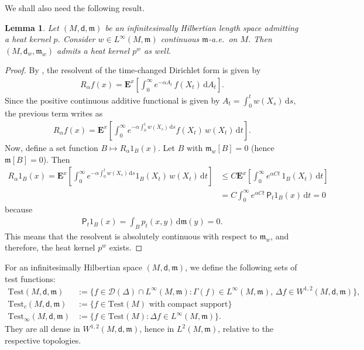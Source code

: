 \documentclass[10pt]{article}
\newcommand{\m}{\mathfrak{m}}
\newcommand{\M}{{\mathit{M}}}
\renewcommand{\d}{\,\mathrm{d}}
\newcommand{\Test}{\mathrm{Test}}
\newcommand{\D}{\mathscr{D}}
\renewcommand{\P}{\mathsf{P}}
\newcommand{\dist}{\mathsf{d}}
\theoremstyle{plain}
\newtheorem{lemma}[theorem]{Lemma}
\theoremstyle{definition}
\newcommand{\Ltwo}{L^2(M,\m)}
\newcommand{\Sob}{W^{1,2}(M,\dist,\m)}
\begin{document}
We shall also need the following result.

\begin{lemma}\label{lem:HKtimechange}
    Let $(M,\dist,\m)$ be an infinitesimally Hilbertian length space admitting a heat kernel $p$. Consider $w \in L^\infty(\M,\m)$  continuous $\m$-a.e.~on $M$. Then $(M,\dist_w,\m_w)$ admits a heat kernel $p^w$ as well.
\end{lemma}

\begin{proof}
By \cite[Lemma A.3.10]{CF}, the resolvent of the time-changed Dirichlet form is given by
\begin{align*}
    R_\alpha f(x) = \mathbf{E}^x\left[ \int_0^\infty e^{-\alpha A_t}\,f(X_t)\d A_t \right].
\end{align*}
Since the positive continuous additive functional is given by $A_t = \int_0^t w(X_s)\d s$, the previous term writes as
\begin{align*}
    R_\alpha f(x) = \mathbf{E}^x \left[\int_0^\infty e^{-\alpha \int_0^t w(X_s)\d s} f(X_t)\,w(X_t)\d t \right].
\end{align*}
Now, define a set function $B\mapsto R_\alpha 1_B(x)$. Let $B$ with $\m_w[B]=0$ (hence $\m[B]=0$). Then
\begin{align*}
    R_\alpha 1_B(x) = \mathbf{E}^x\left[\int_0^\infty e^{-\alpha\int_0^t w(X_s)\d s} 1_B(X_t)\,w(X_t)\d t\right] & \leq C \mathbf{E}^x\left[\int_0^\infty e^{\alpha Ct}\,1_B(X_t)\d t\right] \\
    & = C\int_0^\infty e^{\alpha Ct}\,\P_t1_B(x)\d t=0
\end{align*}
because
\begin{align*}
    \P_t1_B(x) = \int_Bp_t(x,y)\d \m(y) = 0.
\end{align*}
This means that the resolvent is absolutely continuous with respect to $\m_w$, and therefore, the heat kernel  $p^w$ exists.
\end{proof}


For an infinitesimally Hilbertian space $(M,\dist,\m)$, we define the following sets of test functions:
\begin{align*}
\Test(\M,\dist,\m) &:= \{f\in \D(\Delta) \cap L^\infty(\M,\m) : \Gamma(f) \in L^\infty(\M,\m),\,\Delta f\in \Sob\},\\
\Test_{c}(\M,\dist,\m) &:= \{f\in\Test(\M) \text{ with compact support}\}\\
\Test_\infty(\M,\dist,\m) &:= \{f\in\Test(\M) : \Delta f \in L^\infty(\M,\m)\}.
\end{align*}
They are all dense in $\Sob$, hence in $\Ltwo$, relative to the respective topologies.
\end{document}
